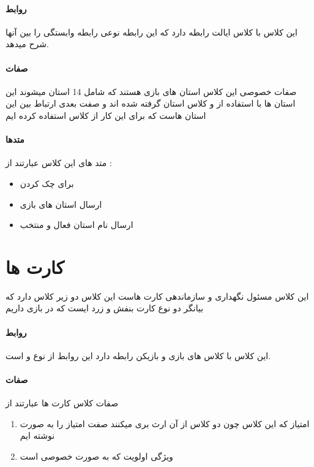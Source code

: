 \documentclass[pdf,titlepage,a4paper]{report}
\begin{document}
    \paragraph{روابط}
	این کلاس با کلاس ایالت رابطه دارد که این رابطه نوعی رابطه وابستگی را بین آنها شرح میدهد.\\
	\paragraph{صفات}
	صفات خصوصی این کلاس استان های بازی هستند که شامل 14 استان میشوند 
	این استان ها با استفاده از  و کلاس استان گرفته شده اند
	و صفت بعدی ارتباط بین این استان هاست که برای این کار از کلاس  استفاده کرده ایم
	\paragraph{متدها}
	
	متد های این کلاس عبارتند از :

	\begin{itemize}
		\item {} برای چک کردن 
		\item {} ارسال استان های بازی 
		\item {} ارسال نام استان فعال و منتخب
	\end{itemize}
	
	\newpage
	\section{کارت ها}
	این کلاس مسئول نگهداری و سازماندهی کارت هاست این کلاس دو زیر کلاس دارد که بیانگر دو نوع کارت بنفش و زرد ایست که در بازی داریم
    \paragraph{روابط}
    این کلاس با کلاس های بازی و بازیکن رابطه دارد
	این روابط از نوع  و  است.\\
	
	\paragraph{صفات}
	صفات کلاس کارت ها  عبارتند از 
	\begin{enumerate}
		\item امتیاز که این کلاس چون دو کلاس از آن ارث بری میکنند صفت امتیاز را به صورت   نوشته ایم
		\item  ویژگی اولویت که به صورت خصوصی است
	\end{enumerate}
\end{document}
